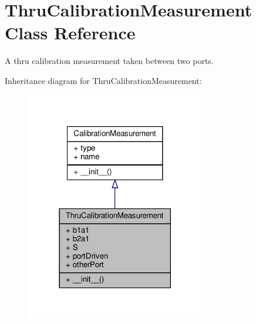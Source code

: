 \hypertarget{classSignalIntegrity_1_1Measurement_1_1Calibration_1_1CalibrationMeasurements_1_1ThruCalibrationMeasurement}{}\section{Thru\+Calibration\+Measurement Class Reference}
\label{classSignalIntegrity_1_1Measurement_1_1Calibration_1_1CalibrationMeasurements_1_1ThruCalibrationMeasurement}


A thru calibration measurement taken between two ports.  




Inheritance diagram for Thru\+Calibration\+Measurement\+:\nopagebreak
\begin{figure}[H]
\begin{center}
\leavevmode
\includegraphics[width=222pt]{classSignalIntegrity_1_1Measurement_1_1Calibration_1_1CalibrationMeasurements_1_1ThruCalibrationMeasurement__inherit__graph}
\end{center}
\end{figure}


